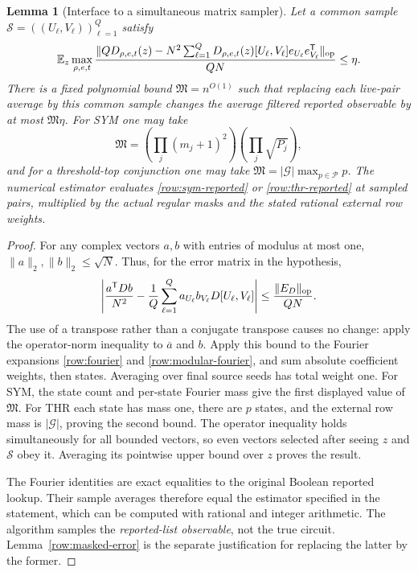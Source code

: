 \documentclass[11pt,letterpaper]{article}
\newtheorem{lemma}[theorem]{Lemma}
\theoremstyle{definition}
\theoremstyle{remark}
\begin{document}
\begin{lemma}[Interface to a simultaneous matrix sampler]
\label{row:sampler-interface}
Let a common sample $\mathcal S=((U_\ell,V_\ell))_{\ell=1}^Q$ satisfy
\[
 \mathbb E_z\max_{\rho,e,t}
 \frac{\|QD_{\rho,e,t}(z)-
 N^2\sum_{\ell=1}^QD_{\rho,e,t}(z)[U_\ell,V_\ell]
                  e_{U_\ell}e_{V_\ell}^{\mathsf T}\|_{\rm op}}
      {QN}\le\eta.
\]
There is a fixed polynomial bound $\mathfrak M=n^{O(1)}$ such that
replacing each live-pair average by this common sample changes the
average filtered reported observable by at most $\mathfrak M\eta$.
For SYM one may take
\[
 \mathfrak M=\left(\prod_j(m_j+1)^2\right)
                    \left(\prod_j\sqrt{P_j}\right),
\]
and for a threshold-top conjunction one may take
$\mathfrak M=|\mathcal G|\max_{p\in\mathcal P}p$.
The numerical estimator evaluates \eqref{row:sym-reported} or
\eqref{row:thr-reported} at sampled pairs, multiplied by the actual
regular masks and the stated rational external row weights.
\end{lemma}

\begin{proof}
For any complex vectors $a,b$ with entries of modulus at most one,
$\|a\|_2,\|b\|_2\le\sqrt N$.  Thus, for the error matrix in the
hypothesis,
\[
 \left|\frac{a^{\mathsf T}Db}{N^2}
 -\frac1Q\sum_{\ell=1}^Qa_{U_\ell}b_{V_\ell}
                                  D[U_\ell,V_\ell]\right|
 \le\frac{\|E_D\|_{\rm op}}{QN}.
\]
The use of a transpose rather than a conjugate transpose causes no
change: apply the operator-norm inequality to $\overline a$ and $b$.
Apply this bound to the Fourier expansions
\eqref{row:fourier} and \eqref{row:modular-fourier}, and sum absolute
coefficient weights, then states.  Averaging over final source seeds
has total weight one.  For SYM, the state count and per-state Fourier
mass give the first displayed value of $\mathfrak M$.  For THR each
state has mass one, there are $p$ states, and the external row mass is
$|\mathcal G|$, proving the second bound.  The operator inequality
holds simultaneously for all bounded vectors, so even vectors selected
after seeing $z$ and $\mathcal S$ obey it.  Averaging its pointwise
upper bound over $z$ proves the result.

The Fourier identities are exact equalities to the original Boolean
reported lookup.  Their sample averages therefore equal the estimator
specified in the statement, which can be computed with rational and
integer arithmetic.  The algorithm samples the \emph{reported-list
observable}, not the true circuit.  Lemma~\ref{row:masked-error} is the
separate justification for replacing the latter by the former.
\end{proof}
\end{document}
